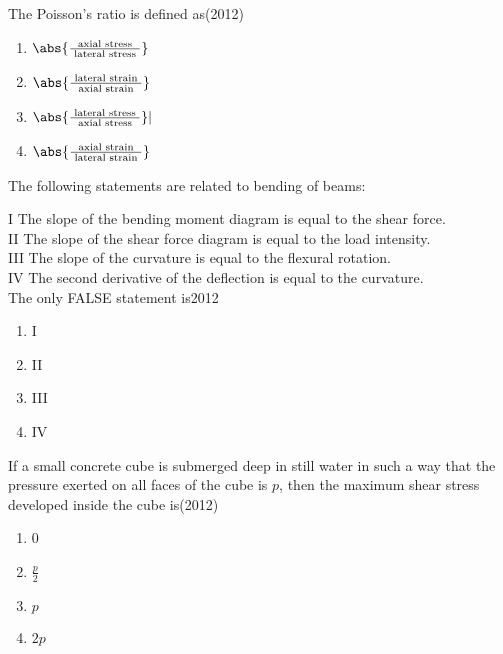 	\item The Poisson's ratio is defined as\hfill{(2012)}

   \begin{multicols}{4}
			\begin{enumerate}
\item $\abs{\frac{\text { axial stress }}{\text { lateral stress }}}$
\item  $\abs{\frac{\text { lateral strain }}{\text { axial strain }}}$
\item $\abs{\frac{\text { lateral stress }}{\text { axial stress }}}|$
\item $\abs{\frac{\text { axial strain }}{\text { lateral strain }}}$
   \end{enumerate}
		\end{multicols}


  \item The following statements are related to bending of beams:

I The slope of the bending moment diagram is equal to the shear force.\\
II The slope of the shear force diagram is equal to the load intensity.\\
III The slope of the curvature is equal to the flexural rotation.\\
IV The second derivative of the deflection is equal to the curvature.\\
The only FALSE statement is\hfill{2012}

   \begin{multicols}{4}
			\begin{enumerate}
   \item I
\item II
\item III
\item IV
\end{enumerate}
		\end{multicols}


	\item If a small concrete cube is submerged deep in still water in such a way that the pressure exerted on all faces of the cube is $p$, then the maximum shear stress developed inside the cube is\hfill{(2012)}

   \begin{multicols}{1}
			\begin{enumerate}
   \item  0
\item$\frac{p}{2}$
\item $p$
\item$2 p$
\end{enumerate}
		\end{multicols}


